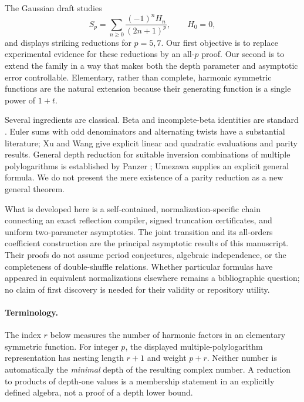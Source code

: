 \documentclass[11pt]{article}
\numberwithin{equation}{section}
\theoremstyle{definition}\newtheorem{definition}[theorem]{Definition}
\theoremstyle{remark}\newtheorem{remark}[theorem]{Remark}
\begin{document}
The Gaussian draft studies
\begin{equation}\label{eq:oldsum}
 S_p=\sum_{n\ge0}\frac{(-1)^nH_n}{(2n+1)^p},\qquad H_0=0,
\end{equation}
and displays striking reductions for $p=5,7$. Our first objective is to replace experimental evidence for these reductions by an all-$p$ proof. Our second is to extend the family in a way that makes both the depth parameter and asymptotic error controllable. Elementary, rather than complete, harmonic symmetric functions are the natural extension because their generating function is a single power of $1+t$.

Several ingredients are classical. Beta and incomplete-beta identities are standard \cite{DLMFbeta,DLMFincbeta}. Euler sums with odd denominators and alternating twists have a substantial literature; Xu and Wang \cite{XuWang} give explicit linear and quadratic evaluations and parity results. General depth reduction for suitable inversion combinations of multiple polylogarithms is established by Panzer \cite{Panzer}; Umezawa \cite{Umezawa} supplies an explicit general formula. We do not present the mere existence of a parity reduction as a new general theorem.

What is developed here is a self-contained, normalization-specific chain connecting an exact reflection compiler, signed truncation certificates, and uniform two-parameter asymptotics. The joint transition and its all-orders coefficient construction are the principal asymptotic results of this manuscript. Their proofs do not assume period conjectures, algebraic independence, or the completeness of double-shuffle relations. Whether particular formulas have appeared in equivalent normalizations elsewhere remains a bibliographic question; no claim of first discovery is needed for their validity or repository utility.

\paragraph{Terminology.}
The index $r$ below measures the number of harmonic factors in an elementary symmetric function. For integer $p$, the displayed multiple-polylogarithm representation has nesting length $r+1$ and weight $p+r$. Neither number is automatically the \emph{minimal} depth of the resulting complex number. A reduction to products of depth-one values is a membership statement in an explicitly defined algebra, not a proof of a depth lower bound.
\end{document}
